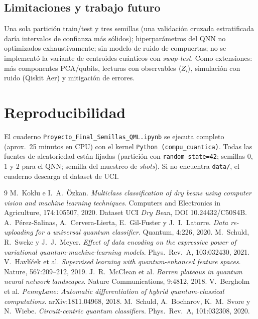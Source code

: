 \documentclass[11pt,letterpaper]{article}
\begin{document}
\subsection*{Limitaciones y trabajo futuro}
Una sola partición train/test y tres semillas (una validación cruzada estratificada daría
intervalos de confianza más sólidos); hiperparámetros del QNN no optimizados exhaustivamente; sin
modelo de ruido de compuertas; no se implementó la variante de centroides cuánticos con
\emph{swap-test}. Como extensiones: más componentes PCA/qubits, lecturas con observables
$\langle Z_i\rangle$, simulación con ruido (Qiskit Aer) y mitigación de errores.

\section{Reproducibilidad}
El cuaderno \texttt{Proyecto\_Final\_Semillas\_QML.ipynb} se ejecuta completo (aprox.\ 25 minutos en
CPU) con el kernel \texttt{Python (compu\_cuantica)}. Todas las fuentes de aleatoriedad están
fijadas (partición con \texttt{random\_state=42}; semillas 0, 1 y 2 para el QNN; semilla del
muestreo de \emph{shots}). Si no encuentra \texttt{data/}, el cuaderno descarga el dataset de UCI.

\begin{thebibliography}{9}
 M.\ Koklu e I.\ A.\ Özkan. \emph{Multiclass classification of dry beans using
computer vision and machine learning techniques}. Computers and Electronics in Agriculture,
174:105507, 2020. Dataset UCI \emph{Dry Bean}, DOI 10.24432/C50S4B.
 A.\ Pérez-Salinas, A.\ Cervera-Lierta, E.\ Gil-Fuster y J.\ I.\ Latorre.
\emph{Data re-uploading for a universal quantum classifier}. Quantum, 4:226, 2020.
 M.\ Schuld, R.\ Sweke y J.\ J.\ Meyer. \emph{Effect of data encoding on the
expressive power of variational quantum-machine-learning models}. Phys.\ Rev.\ A, 103:032430, 2021.
 V.\ Havlíček et al. \emph{Supervised learning with quantum-enhanced feature
spaces}. Nature, 567:209--212, 2019.
 J.\ R.\ McClean et al. \emph{Barren plateaus in quantum neural network
landscapes}. Nature Communications, 9:4812, 2018.
 V.\ Bergholm et al. \emph{PennyLane: Automatic differentiation of hybrid
quantum-classical computations}. arXiv:1811.04968, 2018.
 M.\ Schuld, A.\ Bocharov, K.\ M.\ Svore y N.\ Wiebe. \emph{Circuit-centric
quantum classifiers}. Phys.\ Rev.\ A, 101:032308, 2020.
\end{thebibliography}
\end{document}
